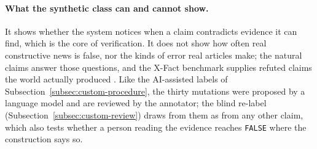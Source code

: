 \paragraph{What the synthetic class can and cannot show.} It shows
whether the system notices when a claim contradicts evidence it can
find, which is the core of verification. It does not show how often
real constructive news is false, nor the kinds of error real articles
make; the natural claims answer those questions, and the X-Fact
benchmark supplies refuted claims the world actually produced
\cite{gupta2021xfact}. Like the AI-assisted labels of
Subsection~\ref{subsec:custom-procedure}, the thirty mutations were
proposed by a language model and are reviewed by the annotator; the
blind re-label (Subsection~\ref{subsec:custom-review}) draws from
them as from any other claim, which also tests whether a person reading
the evidence reaches \texttt{FALSE} where the construction says so.
